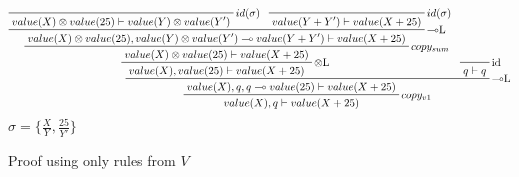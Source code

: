 \documentclass[sigconf]{acmart}
\begin{document}
\begin{figure*}
\[
  \prftree[r] {$\multimap$L}
  {
    \prftree[r] {$\otimes$L}
    {
      \prftree[r] {$copy_{sum}$}
      {
        \prftree[r] {$\multimap$L}
        {
          \prftree[r] {$id(\sigma)$}
          {
            value(X)\otimes value(25)\vdash value(Y)\otimes value(Y')
          }
        }
        {
          \prftree[r] {$id(\sigma)$}
          {
            value(Y + Y')\vdash value(X + 25)
          }
        }
        {
          value(X)\otimes value(25), value(Y)\otimes value(Y')\multimap value(Y + Y')\vdash value(X + 25)
        }
      }
      { value(X)\otimes value(25)\vdash value(X + 25) }
    }
    { value(X),value(25)\vdash value(X + 25) }
  }
  {
    \prftree[r] {id}
    { q\vdash q }
  }
  { \prftree[r] {$copy_{v1}$}
    {value(X),q,q\multimap value(25)\vdash value(X + 25)}
    {value(X),q\vdash value(X + 25)}
  }
\]
$\sigma = \{\frac{X}{Y}, \frac{25}{Y'}\}$
\caption{Proof using only rules from $V$}
\label{pf1}
\end{figure*}
\end{document}
